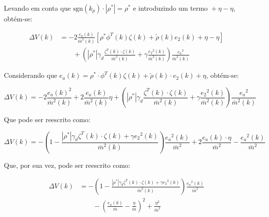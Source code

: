     Levando em conta que $\mathrm{sgn}(k_p)\cdot|\rho^*|=\rho^*$ e introduzindo um termo ${}+ \eta - \eta$, obtém-se:

    \begin{equation*}
        \begin{split}
            \Delta V(k) &= -2 \frac{e_a(k)}{{\bar{m}}^2(k)} \left[ \rho^* \phi^T(k) \zeta(k)
                + \tilde{\rho}(k) e_2(k) + \eta - \eta \right] \\
                &\qquad {}+ \left( |\rho^*| \gamma_d \frac{\zeta^T(k) \cdot \zeta(k)}{{\bar{m}}^2(k)}
                + \gamma \frac{{e_2}^2(k)}{{\bar{m}}^2(k)} \right) \frac{{e_a}^2}{{\bar{m}}^2(k)}
        \end{split}
    \end{equation*}

    Considerando que $e_a(k) = \rho^* \cdot \phi^T(k) \zeta(k) + \tilde{\rho}(k) \cdot e_2(k) + \eta$, obtém-se:

    \begin{equation*}
        \Delta V(k) = -2 \frac{e_a(k)^2}{{\bar{m}}^2(k)} +2 \frac{e_a(k)}{{\bar{m}}^2(k)} \eta
            + \left( |\rho^*| \gamma_d \frac{\zeta^T(k) \cdot \zeta(k)}{{\bar{m}}^2(k)}
            + \gamma \frac{{e_2}^2(k)}{{\bar{m}}^2(k)} \right) \frac{{e_a}^2}{{\bar{m}}^2(k)}
    \end{equation*}

    Que pode ser reescrito como:

    \begin{equation*}
        \Delta V(k) = - \left( 1 - \frac{|\rho^*| \gamma_d \zeta^T(k) \cdot \zeta(k)
            + \gamma {e_2}^2(k)}{{\bar{m}}^2(k)} \right) \frac{{e_a}^2(k)}{{\bar{m}}^2}
            + 2 \frac{e_a(k) \cdot \eta}{{\bar{m}}^2} - \frac{{e_a}^2(k)}{{\bar{m}}^2}
    \end{equation*}

    Que, por sua vez, pode ser reescrito como:

    \begin{equation}
        \begin{split}
            \Delta V(k) &= - \left( 1 - \frac{|\rho^*| \gamma_d \zeta^T(k) \cdot \zeta(k)
            + \gamma {e_2}^2(k)}{{\bar{m}}^2(k)} \right) \frac{{e_a}^2(k)}{{\bar{m}}^2} \\
            &\qquad {}- {\left( \frac{e_a(k)}{\bar{m}} - \frac{\eta}{\bar{m}} \right)}^2 + \frac{\eta^2}{{\bar{m}}^2}
        \end{split}
    \end{equation}

